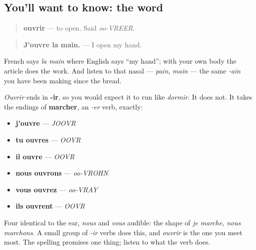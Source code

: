 \subsection*{You'll want to know: the word}
\begin{quote}
\textbf{ouvrir} — to open. Said \emph{oo-VREER}.
\end{quote}

\begin{quote}
\textbf{J'ouvre la main.} — I open my hand.
\end{quote}

French says \emph{la main} where English says \textquotedblleft{}my hand\textquotedblright{}; with your own body the article does the work. And listen to that nasal — \emph{pain}, \emph{main} — the same \emph{-ain} you have been making since the bread.

\begin{grammarlens}[title={Grammar Lens: the endings it should not have}]
\emph{Ouvrir} ends in \textbf{-ir}, so you would expect it to run like \emph{dormir}. It does not. It takes the endings of \textbf{marcher}, an \emph{-er} verb, exactly:

\begin{itemize}
\raggedright
  \item \textbf{j'ouvre} — \emph{JOOVR}
  \item \textbf{tu ouvres} — \emph{OOVR}
  \item \textbf{il ouvre} — \emph{OOVR}
  \item \textbf{nous ouvrons} — \emph{oo-VROHN}
  \item \textbf{vous ouvrez} — \emph{oo-VRAY}
  \item \textbf{ils ouvrent} — \emph{OOVR}
\end{itemize}

Four identical to the ear, \emph{nous} and \emph{vous} audible: the shape of \emph{je marche, nous marchons}. A small group of \emph{-ir} verbs does this, and \emph{ouvrir} is the one you meet most. The spelling promises one thing; listen to what the verb does.
\end{grammarlens}


